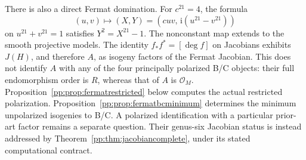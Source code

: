 There is also a direct Fermat domination. For $c^{21}=4$, the formula
\[
 (u,v)\longmapsto (X,Y)=(cuv,\,\mathrm i(u^{21}-v^{21}))
\]
on $u^{21}+v^{21}=1$ satisfies $Y^2=X^{21}-1$.
The nonconstant map extends to the smooth projective models. The identity
$f_*f^*=[\deg f]$ on Jacobians exhibits $J(H)$, and therefore $A$, as
isogeny factors of the Fermat Jacobian.
This does not identify $A$ with any of the four principally polarized
B/C objects: their full endomorphism order is $R$, whereas that of $A$
is $\mathcal O_M$. Proposition~\ref{pp:prop:fermatrestricted} below
computes the actual restricted polarization. Proposition~\ref{pp:prop:fermatbcminimum}
determines the minimum unpolarized isogenies to B/C. A polarized identification
with a particular prior-art factor remains a separate question. Their genus-six Jacobian status is instead addressed by
Theorem~\ref{pp:thm:jacobiancomplete}, under its stated computational contract.

